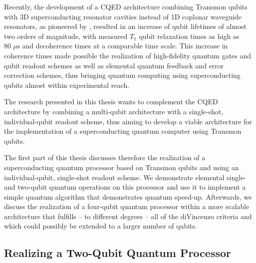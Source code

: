 Recently, the development of a CQED architecture combining Transmon qubits with 3D superconducting resonator cavities instead of 1D coplanar waveguide resonators, as pioneered by \cite{paik_observation_2011}, resulted in an increase of qubit lifetimes of almost two orders of magnitude, with measured $T_1$ qubit relaxation times as high as $80 \; \mu \mathrm{s}$ and decoherence times at a comparable time scale. This increase in coherence times made possible the realization of high-fidelity quantum gates and qubit readout schemes  as well as elemental quantum feedback and error correction schemes, thus bringing quantum computing using superconducting qubits almost within experimental reach.

The research presented in this thesis wants to complement the CQED architecture by combining a multi-qubit architecture with a single-shot, individual-qubit readout scheme, thus aiming to develop a viable architecture for the implementation of a superconducting quantum computer using Transmon qubits. 

The first part of this thesis discusses therefore the realization of a superconducting quantum processor based on Transmon qubits and using an individual-qubit, single-shot readout scheme. We demonstrate elemental single- and two-qubit quantum operations on this processor and use it to implement a simple quantum algorithm that demonstrates quantum speed-up. Afterwards, we discuss the realization of a four-qubit quantum processor within a more scalable architecture that fulfills -- to different degrees -- all of the diVincenzo criteria and which could possibly be extended to a larger number of qubits.

\subsection{Realizing a Two-Qubit Quantum Processor}

